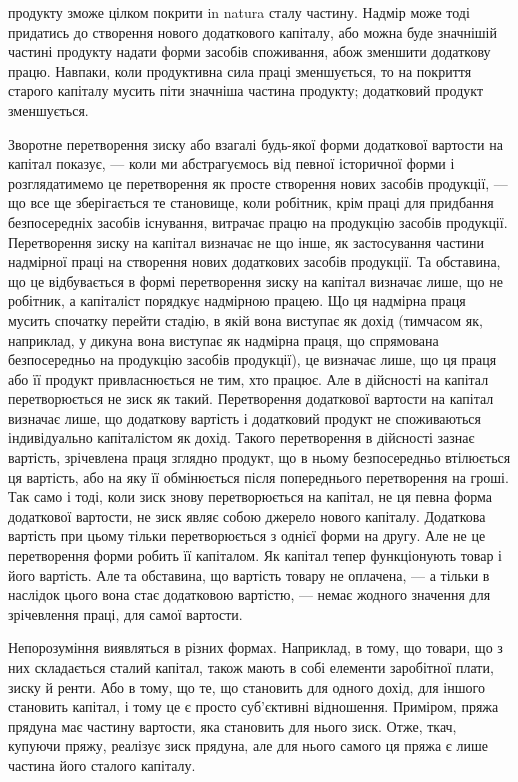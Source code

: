 \parcont{}  %
продукту зможе цілком покрити in natura сталу частину. Надмір може тоді
придатись до створення нового додаткового капіталу, або можна буде значнішій
частині продукту надати форми засобів споживання, абож зменшити додаткову
працю. Навпаки, коли продуктивна сила праці зменшується, то на покриття старого
капіталу мусить піти значніша частина продукту; додатковий продукт зменшується.

Зворотне перетворення зиску або взагалі будь-якої форми додаткової вартости
на капітал показує, — коли ми абстрагуємось від певної історичної форми
і розглядатимемо це перетворення як просте створення нових засобів продукції, —
що все ще зберігається те становище, коли робітник, крім праці для придбання
безпосередніх засобів існування, витрачає працю на продукцію засобів продукції.
Перетворення зиску на капітал визначає не що інше, як застосування
частини надмірної праці на створення нових додаткових засобів продукції. Та
обставина, що це відбувається в формі перетворення зиску на капітал визначає лише,
що не робітник, а капіталіст порядкує надмірною працею. Що ця надмірна праця
мусить спочатку перейти стадію, в якій вона виступає як дохід (тимчасом як,
наприклад, у дикуна вона виступає як надмірна праця, що спрямована безпосередньо
на продукцію засобів продукції), це визначає лише, що ця праця або
її продукт привласнюється не тим, хто працює. Але в дійсності на капітал
перетворюється не зиск як такий. Перетворення додаткової вартости на капітал
визначає лише, що додаткову вартість і додатковий продукт не споживаються
індивідуально капіталістом як дохід. Такого перетворення в дійсності
зазнає вартість, зрічевлена праця зглядно продукт, що в ньому безпосередньо втілюється ця вартість,
або на яку її обмінюється після попереднього перетворення
на гроші. Так само і тоді, коли зиск знову перетворюється на капітал, не ця
певна форма додаткової вартости, не зиск являє собою джерело нового капіталу.
Додаткова вартість при цьому тільки перетворюється з однієї форми на другу.
Але не це перетворення форми робить її капіталом. Як капітал тепер функціонують
товар і його вартість. Але та обставина, що вартість товару не оплачена, —
а тільки в наслідок цього вона стає додатковою вартістю, — немає жодного значення
для зрічевлення праці, для самої вартости.

Непорозуміння виявляться в різних формах. Наприклад, в тому, що товари,
що з них складається сталий капітал, також мають в собі елементи заробітної
плати, зиску й ренти. Або в тому, що те, що становить для одного дохід, для
іншого становить капітал, і тому це є просто суб’єктивні відношення. Приміром,
пряжа прядуна має частину вартости, яка становить для нього зиск. Отже, ткач,
купуючи пряжу, реалізує зиск прядуна, але для нього самого ця пряжа є лише
частина його сталого капіталу.

